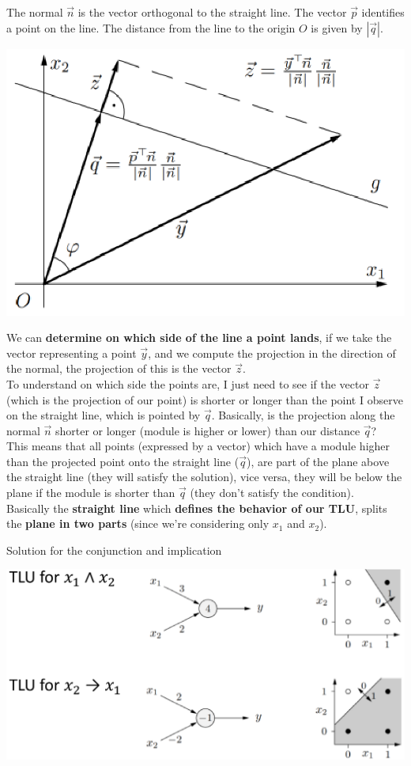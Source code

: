 The normal $\vec{n}$ is the vector orthogonal to the straight line. The vector $\vec{p}$ identifies a point on the line. The distance from the line to the origin $O$ is given by $|\vec{q}|$.\\

\begin{center}
	\includegraphics[width=0.65\columnwidth]{img/NN/GeomInt2}
\end{center}

We can \textbf{determine on which side of the line a point lands}, if we take the vector representing a point $\vec{y}$, and we compute the projection in the direction of the normal, the projection of this is 	the vector $\vec{z}$.\\

To understand on which side the points are, I just need to see if the vector $\vec{z}$ (which is the projection of our point) is shorter or longer than the point I observe on the straight line, which is pointed by $\vec{q}$. Basically, is the projection along the normal $\vec{n}$ shorter or longer (module is higher or lower) than our distance $\vec{q}$? \\

This means that all points (expressed by a vector) which have a module higher than the projected point onto the straight line ($\vec{q}$), are part of the plane above the straight line (they will satisfy the solution), vice versa, they will be below the plane if the module is shorter than $\vec{q}$ (they don't satisfy the condition).\\

Basically the \textbf{straight line} which \textbf{defines the behavior of our TLU}, splits the \textbf{plane in two parts} (since we're considering only $x_1$ and $x_2$).\\

\newpage

Solution for the conjunction and implication
\begin{center}
	\includegraphics[width=0.95\columnwidth]{img/NN/TLU5}
\end{center}

